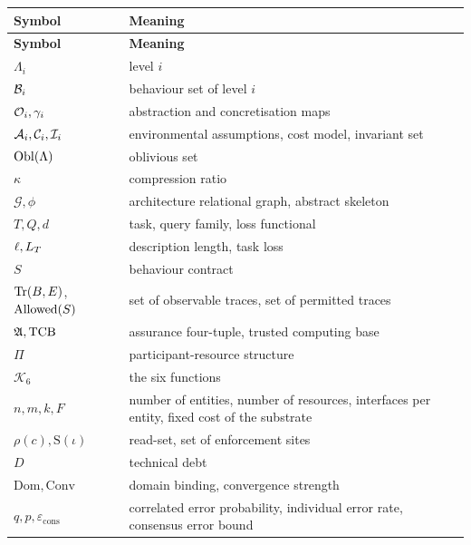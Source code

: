 \begin{longtable}{L{3.0cm}L{11.4cm}}
\toprule
\textbf{Symbol} & \textbf{Meaning} \\
\midrule
\endfirsthead
\toprule
\textbf{Symbol} & \textbf{Meaning} \\
\midrule
\endhead
\bottomrule
\endlastfoot
$\Lambda_i$ & level $i$ \\
$\mathcal{B}_i$ & behaviour set of level $i$ \\
$\mathcal{O}_i, \gamma_i$ & abstraction and concretisation maps \\
$\mathcal{A}_i, \mathcal{C}_i, \mathcal{I}_i$ & environmental assumptions, cost model, invariant set \\
$\operatorname{Obl}(\Lambda)$ & oblivious set \\
$\kappa$ & compression ratio \\
$\mathcal{G}, \phi$ & architecture relational graph, abstract skeleton \\
$T, Q, d$ & task, query family, loss functional \\
$\ell, L_T$ & description length, task loss \\
$S$ & behaviour contract \\
$\operatorname{Tr}(B,E)$, $\operatorname{Allowed}(S)$ & set of observable traces, set of permitted traces \\
$\mathfrak{A}, \mathrm{TCB}$ & assurance four-tuple, trusted computing base \\
$\Pi$ & participant-resource structure \\
$\mathcal{K}_6$ & the six functions \\
$n, m, k, F$ & number of entities, number of resources, interfaces per entity, fixed cost
  of the substrate \\
$\rho(c), \mathrm{S}(\iota)$ & read-set, set of enforcement sites \\
$D$ & technical debt \\
$\mathrm{Dom}, \mathrm{Conv}$ & domain binding, convergence strength \\
$q, p, \varepsilon_{\text{cons}}$ & correlated error probability, individual error rate,
  consensus error bound \\
\bottomrule
\end{longtable}
